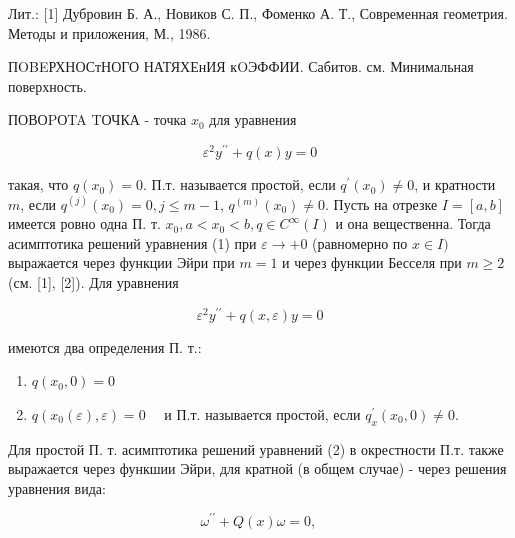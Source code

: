 \documentclass[10pt]{article}
\begin{document}
Лит.: [1] Дубровин Б. А., Новиков С. П., Фоменко А. Т., Современная геометрия. Методы и приложения, М., 1986.



ПOBEРХНОСтНОГО НАТЯХЕнИЯ кOЭФФИИ. Сабитов. см. Минимальная поверхность.



ПОВОPОTA TОЧКА - точка $x_{0}$ для уравнения



\[

\varepsilon^{2} y^{\prime \prime}+q(x) y=0

\]



такая, что $q\left(x_{0}\right)=0$. П.т. называется простой, если $q^{\prime}\left(x_{0}\right) \neq 0$, и кратности $m$, если $q^{(j)}\left(x_{0}\right)=0, j \leqslant m-1$, $q^{(m)}\left(x_{0}\right) \neq 0$. Пусть на отрезке $I=[a, b]$ имеется ровно одна П. т. $x_{0}, a<x_{0}<b, q \in C^{\infty}(I)$ и она вещественна. Тогда асимптотика решений уравнения (1) при $\varepsilon \rightarrow+0$ (равномерно по $x \in I)$ выражается через функции Эйри при $m=1$ и через функции Бесселя при $m \geqslant 2$ (см. [1], [2]). Для уравнения



\[

\varepsilon^{2} y^{\prime \prime}+q(x, \varepsilon) y=0

\]



имеются два определения П. т.:



\begin{enumerate}

  \item $q\left(x_{0}, 0\right)=0$



  \item $q\left(x_{0}(\varepsilon), \varepsilon\right)=0 \quad$ и П.т. называется простой, если $q_{x}^{\prime}\left(x_{0}, 0\right) \neq 0$.



\end{enumerate}



Для простой П. т. асимптотика решений уравнений (2) в окрестности П.т. также выражается через функшии Эйри, для кратной (в общем случае) - через решения уравнения вида:



\[

\omega^{\prime \prime}+Q(x) \omega=0 \text {, }

\]
\end{document}
